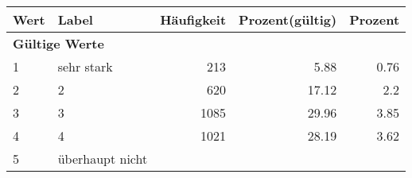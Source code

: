      \begin{longtable}{lXrrr}
     \toprule
     \textbf{Wert} & \textbf{Label} & \textbf{Häufigkeit} & \textbf{Prozent(gültig)} & \textbf{Prozent} \\
     \endhead
     \midrule
     \multicolumn{5}{l}{\textbf{Gültige Werte}}\\

     1 &
     \multicolumn{1}{X}{ sehr stark   } &


       \num{213} &
       \num[round-mode=places,round-precision=2]{5,88} &
         \num[round-mode=places,round-precision=2]{0,76} \\

     2 &
     \multicolumn{1}{X}{ 2   } &


       \num{620} &
       \num[round-mode=places,round-precision=2]{17,12} &
         \num[round-mode=places,round-precision=2]{2,2} \\

     3 &
     \multicolumn{1}{X}{ 3   } &


       \num{1085} &
       \num[round-mode=places,round-precision=2]{29,96} &
         \num[round-mode=places,round-precision=2]{3,85} \\

     4 &
     \multicolumn{1}{X}{ 4   } &


       \num{1021} &
       \num[round-mode=places,round-precision=2]{28,19} &
         \num[round-mode=places,round-precision=2]{3,62} \\

     5 &
     \multicolumn{1}{X}{ überhaupt nicht   } &



\end{longtable}
